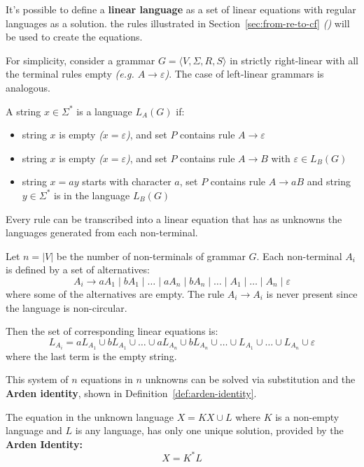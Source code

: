\documentclass[english]{article}
\begin{document}
It's possible to define a \textbf{linear language} as a set of linear equations with regular languages as a solution.
the rules illustrated in Section~\ref{sec:from-re-to-cf} \textit{()} will be used to create the equations.

For simplicity, consider a grammar \(G = \langle V, \Sigma, R, S \rangle\) in strictly right-linear with all the terminal rules empty \textit{(e.g. \(A \rightarrow \varepsilon\))}.
The case of left-linear grammars is analogous.

A string \(x \in \Sigma^\ast\) is a language \(L_A(G)\) if:

\begin{itemize}
  \item string \(x\) is empty \textit{(\(x = \varepsilon\))}, and set \(P\) contains rule \(A \rightarrow \varepsilon\)
  \item string \(x\) is empty \textit{(\(x = \varepsilon\))}, and set \(P\) contains rule \(A \rightarrow B\) with \(\varepsilon \in L_B(G)\)
  \item string \(x = ay\) starts with character \(a\), set \(P\) contains rule \(A \rightarrow aB\) and string \(y \in \Sigma^\ast\) is in the language \(L_B(G)\)
\end{itemize}

Every rule can be transcribed into a linear equation that has as unknowns the languages generated from each non-terminal.

Let \(n = |V|\) be the number of non-terminals of grammar \(G\).
Each non-terminal \(A_i\) is defined by a set of alternatives:
\[ A_i \rightarrow a A_1 \mid b A_1 \mid \ldots \mid a A_n \mid b A_n \mid \ldots \mid A_1 \mid \ldots \mid A_n \mid \varepsilon \]
where some of the alternatives are empty. The rule \(A_i \rightarrow A_i\) is never present since the language is non-circular.

Then the set of corresponding linear equations is:
\[ L_{A_i} = a L_{A_1} \cup b L_{A_1} \cup \ldots \cup a L_{A_n} \cup b L_{A_n} \cup \ldots \cup L_{A_1} \cup \ldots \cup L_{A_n} \cup \varepsilon \]
where the last term is the empty string.

This system of \(n\) equations in \(n\) unknowns can be solved via substitution and the \textbf{Arden identity}, shown in Definition~\ref{def:arden-identity}.

\begin{definition}
  \label{def:arden-identity}
  The equation in the unknown language \(X= K X \cup L\) where \(K\) is a non-empty language and \(L\) is any language, has only one unique solution, provided by the \textbf{Arden Identity:}
  \[ X = K^\ast L \]
\end{definition}
\end{document}
